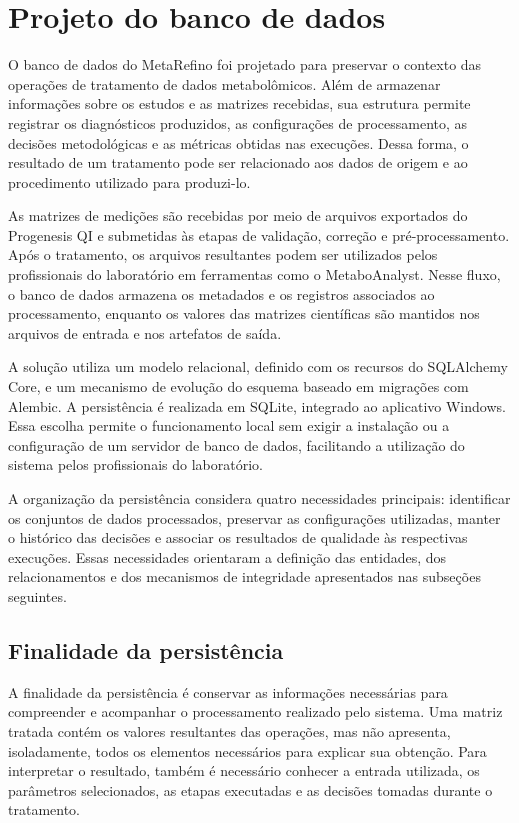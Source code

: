 \section{Projeto do banco de dados}
\label{sec:projeto-banco-dados}

O banco de dados do MetaRefino foi projetado para preservar o contexto das operações de tratamento de dados metabolômicos. Além de armazenar informações sobre os estudos e as matrizes recebidas, sua estrutura permite registrar os diagnósticos produzidos, as configurações de processamento, as decisões metodológicas e as métricas obtidas nas execuções. Dessa forma, o resultado de um tratamento pode ser relacionado aos dados de origem e ao procedimento utilizado para produzi-lo.

As matrizes de medições são recebidas por meio de arquivos exportados do Progenesis QI e submetidas às etapas de validação, correção e pré-processamento. Após o tratamento, os arquivos resultantes podem ser utilizados pelos profissionais do laboratório em ferramentas como o MetaboAnalyst. Nesse fluxo, o banco de dados armazena os metadados e os registros associados ao processamento, enquanto os valores das matrizes científicas são mantidos nos arquivos de entrada e nos artefatos de saída.

A solução utiliza um modelo relacional, definido com os recursos do SQLAlchemy Core, e um mecanismo de evolução do esquema baseado em migrações com Alembic. A persistência é realizada em SQLite, integrado ao aplicativo Windows. Essa escolha permite o funcionamento local sem exigir a instalação ou a configuração de um servidor de banco de dados, facilitando a utilização do sistema pelos profissionais do laboratório.

A organização da persistência considera quatro necessidades principais: identificar os conjuntos de dados processados, preservar as configurações utilizadas, manter o histórico das decisões e associar os resultados de qualidade às respectivas execuções. Essas necessidades orientaram a definição das entidades, dos relacionamentos e dos mecanismos de integridade apresentados nas subseções seguintes.

\subsection{Finalidade da persistência}
\label{subsec:finalidade-persistencia}

A finalidade da persistência é conservar as informações necessárias para compreender e acompanhar o processamento realizado pelo sistema. Uma matriz tratada contém os valores resultantes das operações, mas não apresenta, isoladamente, todos os elementos necessários para explicar sua obtenção. Para interpretar o resultado, também é necessário conhecer a entrada utilizada, os parâmetros selecionados, as etapas executadas e as decisões tomadas durante o tratamento.

